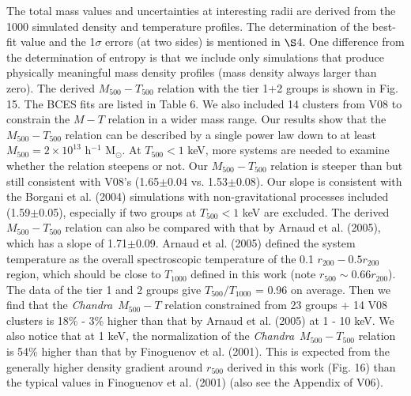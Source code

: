 \documentclass{aastex}
\def\chandra    {{\em Chandra}\/}
\begin{document}
The total mass values and uncertainties at interesting radii are derived from
the 1000 simulated density and temperature profiles. The determination of the
best-fit value and the 1$\sigma$ errors (at two sides) is mentioned in $\S$4.
One difference from the determination of entropy is that we include only
simulations that produce physically meaningful mass density profiles (mass
density always larger than zero). The derived $M_{500} - T_{500}$ relation
with the tier 1+2 groups is shown in Fig. 15. The BCES fits are listed in
Table 6. We also included 14 clusters from V08 to constrain the $M - T$
relation in a wider mass range. Our results show that the $M_{500} - T_{500}$
relation can be described by a single power law down to at least $M_{500} =
2 \times 10^{13}$ h$^{-1}$ M$_{\odot}$. At $T_{500} < 1$ keV, more systems
are needed to examine whether the relation steepens or not. Our $M_{500} - T_{500}$
relation is steeper than but still consistent with V08's (1.65$\pm$0.04 vs. 1.53$\pm$0.08).
Our slope is consistent with the Borgani et al. (2004) simulations with non-gravitational
processes included (1.59$\pm$0.05), especially if two groups at $T_{500} < 1$ keV
are excluded. The derived $M_{500} - T_{500}$
relation can also be compared with that by Arnaud et al. (2005), which has a slope
of 1.71$\pm$0.09. Arnaud et al. (2005) defined the system temperature as the overall
spectroscopic temperature of the 0.1 $r_{200} - 0.5 r_{200}$ region, which should
be close to $T_{1000}$ defined in this work (note $r_{500} \sim 0.66 r_{200}$). The
data of the tier 1 and 2 groups give $T_{500} / T_{1000}$ = 0.96 on average. Then
we find that the \chandra\ $M_{500} - T$ relation constrained from 23 groups + 14 V08
clusters is 18\% - 3\% higher than that by Arnaud et al. (2005) at 1 - 10 keV.
We also notice that at 1 keV, the normalization of the \chandra\ $M_{500} - T_{500}$
relation is 54\% higher than that by Finoguenov et al. (2001). This is
expected from the generally higher density gradient around $r_{500}$ derived
in this work (Fig. 16) than the typical values in Finoguenov et al. (2001)
(also see the Appendix of V06).
\end{document}
